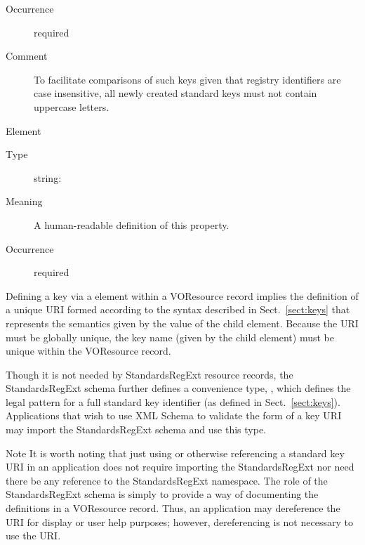 \documentclass[11pt,a4paper]{ivoa}
\begin{document}
\begin{generated}
\begin{bigdescription}
\begin{description}
\item[Occurrence] required

\item[Comment]
                  To facilitate comparisons of such keys given that
                  registry identifiers are case insensitive, all newly
                  created standard keys must not contain uppercase letters.


\end{description}
\item[Element \xmlel{description}]
\begin{description}
\item[Type] string: 
\item[Meaning]
                  A human-readable definition of this property.

\item[Occurrence] required

\end{description}


\end{bigdescription}\endgroup

\endgroup
\end{generated}



Defining a key via a  element within a
VOResource record implies the definition of a unique URI formed
according to the syntax described in Sect.~\ref{sect:keys}
that represents the semantics given by the value of the
 child element.  Because the URI must
be globally unique, the key name (given by the
 child element) must be unique within the
VOResource record.

Though it is not needed by StandardsRegExt resource records, the StandardsRegExt
schema further defines a convenience type,
, which defines the legal pattern for
a full standard key identifier (as defined in
Sect.~\ref{sect:keys}).  Applications that wish to use
XML Schema to validate the form of a key URI may import the StandardsRegExt
schema and use this type.


\begin{admonition}{Note}
It is worth noting that just using or otherwise referencing a
standard key URI in an application does not require importing
the StandardsRegExt nor need there be any reference to the
StandardsRegExt namespace.  The role of the StandardsRegExt schema is
simply to provide a way of documenting the definitions in a
VOResource record.  Thus, an application may dereference the
URI for display or user help purposes; however, dereferencing
is not necessary to use the URI.
\end{admonition}
\end{document}
